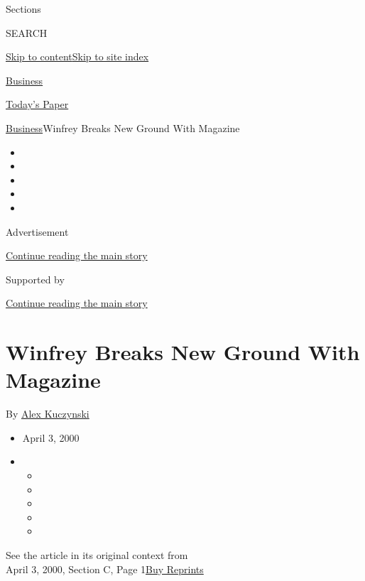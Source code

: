 Sections

SEARCH

\protect\hyperlink{site-content}{Skip to
content}\protect\hyperlink{site-index}{Skip to site index}

\href{https://www.nytimes3xbfgragh.onion/section/business}{Business}

\href{https://myaccount.nytimes3xbfgragh.onion/auth/login?response_type=cookie\&client_id=vi}{}

\href{https://www.nytimes3xbfgragh.onion/section/todayspaper}{Today's
Paper}

\href{/section/business}{Business}\textbar{}Winfrey Breaks New Ground
With Magazine

\begin{itemize}
\item
\item
\item
\item
\item
\end{itemize}

Advertisement

\protect\hyperlink{after-top}{Continue reading the main story}

Supported by

\protect\hyperlink{after-sponsor}{Continue reading the main story}

\hypertarget{winfrey-breaks-new-ground-with-magazine}{%
\section{Winfrey Breaks New Ground With
Magazine}\label{winfrey-breaks-new-ground-with-magazine}}

By \href{https://www.nytimes3xbfgragh.onion/by/alex-kuczynski}{Alex
Kuczynski}

\begin{itemize}
\item
  April 3, 2000
\item
  \begin{itemize}
  \item
  \item
  \item
  \item
  \item
  \end{itemize}
\end{itemize}

See the article in its original context from\\
April 3, 2000, Section C, Page
1\href{https://store.nytimes3xbfgragh.onion/collections/new-york-times-page-reprints?utm_source=nytimes\&utm_medium=article-page\&utm_campaign=reprints}{Buy
Reprints}

